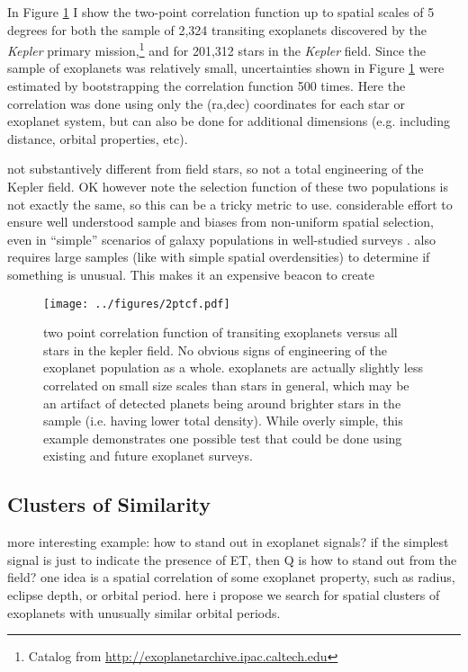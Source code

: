 \documentclass[twocolumn]{aastex62}
\newcommand{\Kepler}{\textsl{Kepler}\xspace}
\begin{document}
In Figure \ref{fig:2pt} I show the two-point correlation function up to spatial scales of 5 degrees for both the sample of 2,324 transiting exoplanets discovered by the \Kepler primary mission,\footnote{Catalog from \url{http://exoplanetarchive.ipac.caltech.edu}} and for 201,312 stars in the \Kepler field. Since the sample of exoplanets was relatively small, uncertainties shown in Figure \ref{fig:2pt} were estimated by bootstrapping the correlation function 500 times. Here the correlation was done using only the (ra,dec) coordinates for each star or exoplanet system, but can also be done for additional dimensions (e.g. including distance, orbital properties, etc).

 not substantively different from field stars, so not a total engineering of the Kepler field. OK however note the selection function of these two populations is not exactly the same, so this can be a tricky metric to  use. considerable effort to ensure well understood sample and biases from non-uniform spatial selection, even in ``simple'' scenarios of galaxy populations in well-studied surveys \citep[e.g.][]{wang2013}. also requires large samples (like with simple spatial overdensities) to determine if something is unusual. This makes it an expensive beacon to create


\begin{figure}[!t]
\centering
\texttt{[image: ../figures/2ptcf.pdf]}
\caption{two point correlation function of transiting exoplanets versus all stars in the kepler field. No obvious signs of engineering of the exoplanet population as a whole. exoplanets are actually slightly less correlated on small size scales than stars in general, which may be an artifact of detected planets being around brighter stars in the sample (i.e. having lower total density). 
While overly simple, this example demonstrates one possible test that could be done using existing and future exoplanet surveys.}
\label{fig:2pt}
\end{figure}


\subsection{Clusters of Similarity}
more interesting example: how to stand out in exoplanet signals? if the simplest signal is just to indicate the presence of ET, then Q is how to stand out from the field? one idea is a spatial correlation of some exoplanet property, such as radius, eclipse depth, or orbital period. here i propose we search for spatial clusters of exoplanets with unusually similar orbital periods.
\end{document}

